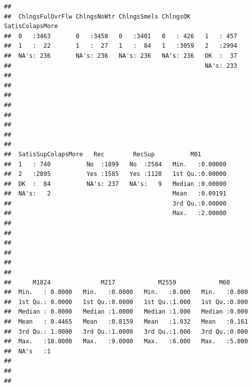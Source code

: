 \documentclass[11pt,]{article}
\begin{document}
\begin{verbatim}
##                                                                     
##  ChlngsFulOvrFlw ChlngsNoWtr ChlngsSmels ChlngsOK    SatisColapsMore
##  0   :3463       0   :3458   0   :3401   0   : 426   1   : 457      
##  1   :  22       1   :  27   1   :  84   1   :3059   2   :2994      
##  NA's: 236       NA's: 236   NA's: 236   NA's: 236   DK  :  37      
##                                                      NA's: 233      
##                                                                     
##                                                                     
##                                                                     
##                                                                     
##                                                                     
##                                                                     
##                                                                     
##                                                                     
##  SatisSupColapsMore   Rec        RecSup          M01         
##  1   : 740          No  :1899   No  :2584   Min.   :0.00000  
##  2   :2895          Yes :1585   Yes :1128   1st Qu.:0.00000  
##  DK  :  84          NA's: 237   NA's:   9   Median :0.00000  
##  NA's:   2                                  Mean   :0.09191  
##                                             3rd Qu.:0.00000  
##                                             Max.   :2.00000  
##                                                              
##                                                              
##                                                              
##                                                              
##                                                              
##                                                              
##      M1824              M217            M2559            M60       
##  Min.   : 0.0000   Min.   :0.0000   Min.   :0.000   Min.   :0.000  
##  1st Qu.: 0.0000   1st Qu.:0.0000   1st Qu.:1.000   1st Qu.:0.000  
##  Median : 0.0000   Median :1.0000   Median :1.000   Median :0.000  
##  Mean   : 0.4465   Mean   :0.8159   Mean   :1.032   Mean   :0.161  
##  3rd Qu.: 1.0000   3rd Qu.:1.0000   3rd Qu.:1.000   3rd Qu.:0.000  
##  Max.   :18.0000   Max.   :9.0000   Max.   :6.000   Max.   :5.000  
##  NA's   :1                                                         
##                                                                    
##                                                                    
##                                                                    

\end{verbatim}
\end{document}
